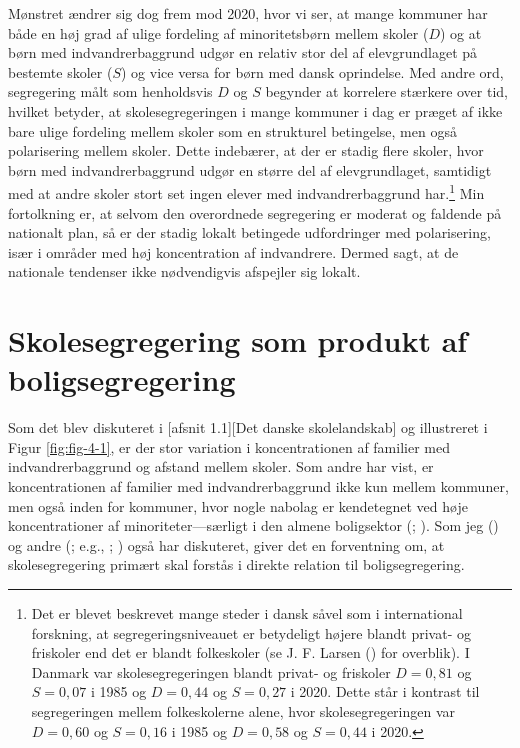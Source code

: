 \documentclass[
]{book}
\begin{document}
Mønstret ændrer sig dog frem mod 2020, hvor vi ser, at mange kommuner har både en høj grad af ulige fordeling af minoritetsbørn mellem skoler (\(D\)) og at børn med indvandrerbaggrund udgør en relativ stor del af elevgrundlaget på bestemte skoler (\(S\)) og vice versa for børn med dansk oprindelse. Med andre ord, segregering målt som henholdsvis \(D\) og \(S\) begynder at korrelere stærkere over tid, hvilket betyder, at skolesegregeringen i mange kommuner i dag er præget af ikke bare ulige fordeling mellem skoler som en strukturel betingelse, men også polarisering mellem skoler. Dette indebærer, at der er stadig flere skoler, hvor børn med indvandrerbaggrund udgør en større del af elevgrundlaget, samtidigt med at andre skoler stort set ingen elever med indvandrerbaggrund har.\footnote{Det er blevet beskrevet mange steder i dansk såvel som i international forskning, at segregeringsniveauet er betydeligt højere blandt privat- og friskoler end det er blandt folkeskoler (se J. F. Larsen () for overblik). I Danmark var skolesegregeringen blandt privat- og friskoler \(D=0,81\) og \(S=0,07\) i 1985 og \(D=0,44\) og \(S=0,27\) i 2020. Dette står i kontrast til segregeringen mellem folkeskolerne alene, hvor skolesegregeringen var \(D=0,60\) og \(S=0,16\) i 1985 og \(D=0,58\) og \(S=0,44\) i 2020.} Min fortolkning er, at selvom den overordnede segregering er moderat og faldende på nationalt plan, så er der stadig lokalt betingede udfordringer med polarisering, især i områder med høj koncentration af indvandrere. Dermed sagt, at de nationale tendenser ikke nødvendigvis afspejler sig lokalt.

\section{Skolesegregering som produkt af boligsegregering}\label{skolesegregering-som-produkt-af-boligsegregering}

Som det blev diskuteret i {[}afsnit 1.1{]}{[}Det danske skolelandskab{]} og illustreret i Figur \ref{fig:fig-4-1}, er der stor variation i koncentrationen af familier med indvandrerbaggrund og afstand mellem skoler. Som andre har vist, er koncentrationen af familier med indvandrerbaggrund ikke kun mellem kommuner, men også inden for kommuner, hvor nogle nabolag er kendetegnet ved høje koncentrationer af minoriteter---særligt i den almene boligsektor (; ). Som jeg () og andre (; e.g., ; ) også har diskuteret, giver det en forventning om, at skolesegregering primært skal forstås i direkte relation til boligsegregering.
\end{document}
